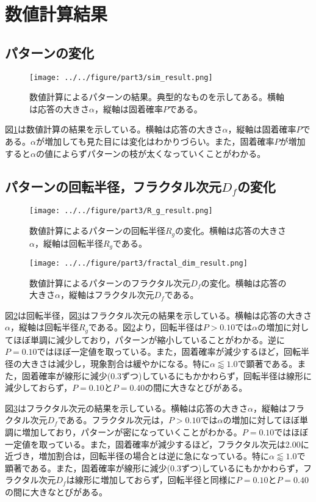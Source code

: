 \documentclass[autodetect-engine,dvi=dvipdfmx,a4paper,ja=standard,oneside,openany,11pt,draft]{bxjsbook}
\begin{document}
\section{数値計算結果}
\subsection{パターンの変化}
\begin{figure}[htbp]
  \centering
  \texttt{[image: ../../figure/part3/sim\_result.png]}
  \caption{数値計算によるパターンの結果。典型的なものを示してある。横軸は応答の大きさ$\alpha$，縦軸は固着確率$P$である。}
  \label{fig:sim_result}
\end{figure}
図\ref{fig:sim_result}は数値計算の結果を示している。横軸は応答の大きさ$\alpha$，縦軸は固着確率$P$である。$\alpha$が増加しても見た目には変化はわかりづらい。また，固着確率$P$が増加すると$\alpha$の値によらずパターンの枝が太くなっていくことがわかる。
\subsection{パターンの回転半径，フラクタル次元$D_f$の変化}
\begin{figure}[htbp]
  \centering
  \texttt{[image: ../../figure/part3/R\_g\_result.png]}
  \caption{数値計算によるパターンの回転半径$R_g$の変化。横軸は応答の大きさ$\alpha$，縦軸は回転半径$R_g$である。}
  \label{fig:R_g_result}
\end{figure}
\begin{figure}
  \centering
  \texttt{[image: ../../figure/part3/fractal\_dim\_result.png]}
  \caption{数値計算によるパターンのフラクタル次元$D_f$の変化。横軸は応答の大きさ$\alpha$，縦軸はフラクタル次元$D_f$である。}
  \label{fig:fractal_dim_result}
\end{figure}
図\ref{fig:R_g_result}は回転半径，図\ref{fig:fractal_dim_result}はフラクタル次元の結果を示している。横軸は応答の大きさ$\alpha$，縦軸は回転半径$R_g$である。図\ref{fig:R_g_result}より，回転半径は$P>0.10$では$\alpha$の増加に対してほぼ単調に減少しており，パターンが縮小していることがわかる。逆に$P=0.10$ではほぼ一定値を取っている。また，固着確率が減少するほど，回転半径の大きさは減少し，現象割合は緩やかになる。特に$\alpha\lessapprox1.0$で顕著である。また，固着確率が線形に減少(0.3ずつ)しているにもかかわらず，回転半径は線形に減少しておらず，$P=0.10$と$P=0.40$の間に大きなとびがある。

図\ref{fig:fractal_dim_result}はフラクタル次元の結果を示している。横軸は応答の大きさ$\alpha$，縦軸はフラクタル次元$D_f$である。フラクタル次元は，$P>0.10$では$\alpha$の増加に対してほぼ単調に増加しており，パターンが密になっていくことがわかる。$P=0.10$ではほぼ一定値を取っている。また，固着確率が減少するほど，フラクタル次元は2.00に近づき，増加割合は，回転半径の場合とは逆に急になっている。特に$\alpha\lessapprox1.0$で顕著である。また，固着確率が線形に減少(0.3ずつ)しているにもかかわらず，フラクタル次元$D_f$は線形に増加しておらず，回転半径と同様に$P=0.10$と$P=0.40$の間に大きなとびがある。
\ifdraft{
  
  
}{}
\end{document}
